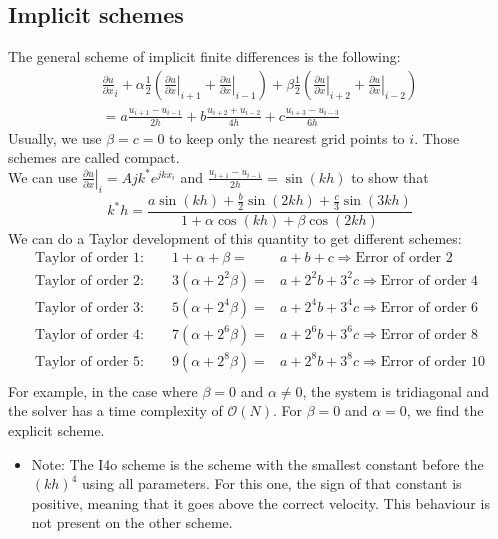 \documentclass[12pt, openany]{report}
\theoremstyle{definition}
\begin{document}
\subsection{Implicit schemes}
The general scheme of implicit finite differences is the following:
\begin{equation}\label{eq:I-order1}
	\begin{aligned}	
		\frac{\partial u}{\partial x}_i + \alpha\frac{1}{2}\left(\left.\frac{\partial u}{\partial x}\right|_{i+1}+\left.\frac{\partial u}{\partial x}\right|_{i-1}\right) + \beta \frac{1}{2}\left(\left.\frac{\partial u}{\partial x}\right|_{i+2} + \left.\frac{\partial u}{\partial x}\right|_{i-2}\right) \\
		= a \frac{u_{i+1}-u_{i-1}}{2h} + b\frac{u_{i+2}+u_{i-2}}{4h} + c \frac{u_{i+3}-u_{i-3}}{6h}
	\end{aligned}
\end{equation}
Usually, we use $\beta=c=0$ to keep only the nearest grid points to $i$. Those schemes are called compact. \\
We can use $\left.\frac{\partial u}{\partial x}\right|_{i} = A j k^* e^{jkx_i}$ and $\frac{u_{i+1}-u_{i-1}}{2h} = \sin(kh)$ to show that 
\begin{equation}
	k^*h = \frac{a\sin(kh) + \frac{b}{2}\sin(2kh) + \frac{c}{3}\sin(3kh)}{1+\alpha \cos(kh)+\beta \cos(2kh)}
\end{equation}
We can do a Taylor development of this quantity to get different schemes:
\begin{equation}
	\begin{aligned}
		\text{Taylor of order 1:}\qquad  1+\alpha+\beta =& a+b+c \Longrightarrow \text{Error of order 2}\\
		\text{Taylor of order 2:}\qquad  3(\alpha+2^2\beta) =& a+2^2b+3^2c \Longrightarrow \text{Error of order 4}\\
		\text{Taylor of order 3:}\qquad  5(\alpha+2^4\beta) =& a+2^4b+3^4c \Longrightarrow \text{Error of order 6}\\
		\text{Taylor of order 4:}\qquad  7(\alpha+2^6\beta) =& a+2^6b+3^6c \Longrightarrow \text{Error of order 8}\\
		\text{Taylor of order 5:}\qquad  9(\alpha+2^8\beta) =& a+2^8b+3^8c \Longrightarrow \text{Error of order 10}\\
	\end{aligned}
\end{equation}
For example, in the case where $\beta= 0$ and $\alpha \neq 0$, the system is tridiagonal and the solver has a time complexity of $\mathcal{O}(N)$. For $\beta=0$ and $\alpha=0$, we find the explicit scheme. 
\begin{itemize}
	\item [$\to$] Note: The I4o scheme is the scheme with the smallest constant before the $(kh)^4$ using all parameters. For this one, the sign of that constant is positive, meaning that it goes above the correct velocity. This behaviour is not present on the other scheme. 
\end{itemize}
\end{document}
